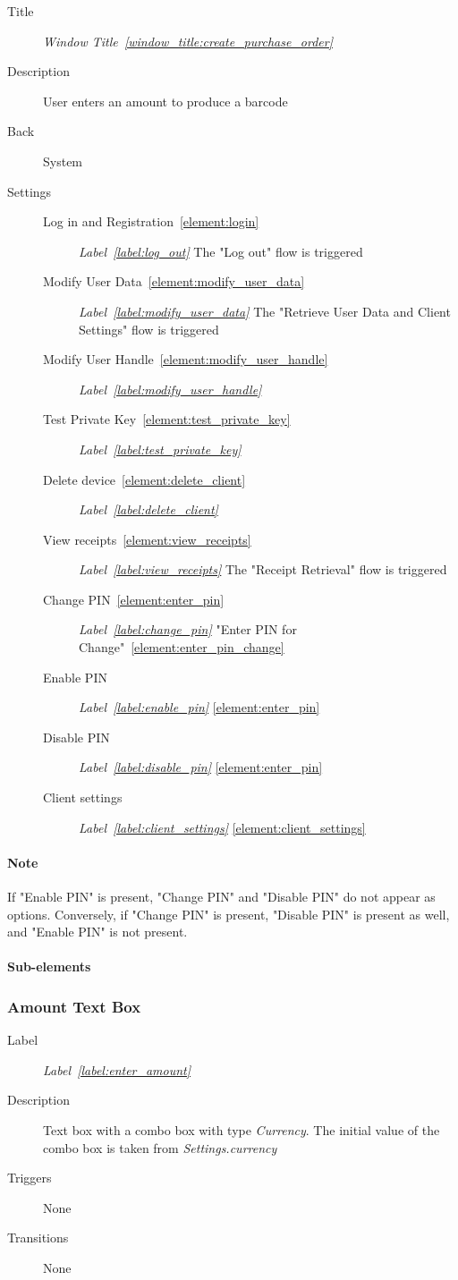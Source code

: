 \documentclass[a4paper,10pt]{article}
\newcommand{\windowTitleLabelText}{Window Title}
\newcommand{\windowTitleLabel}{window_title:}
\DeclareRobustCommand{\windowTitleRef}[1]{%
   \emph{\windowTitleLabelText~\ref{\windowTitleLabel#1}}}
\newcommand{\labelLabelText}{Label}
\newcommand{\labelLabel}{label:}
\DeclareRobustCommand{\labelRef}[1]{%
   \emph{\labelLabelText~\ref{\labelLabel#1}}}
\newcommand{\elementLabel}{element:}
\DeclareRobustCommand{\elementRef}[1]{\ref{\elementLabel#1}}
\begin{document}
\begin{description}
 \item[Title] \windowTitleRef{create_purchase_order}
 \item[Description] User enters an amount to produce a barcode
 \item[Back] System
 \item[Settings]\mbox{}
 \begin{description}
  \item[Log in and Registration~\elementRef{login}] 
\labelRef{log_out} The "Log out" flow is triggered
  \item[Modify User Data~\elementRef{modify_user_data}] 
\labelRef{modify_user_data} The "Retrieve User Data and Client Settings" flow 
is triggered
  \item[Modify User Handle~\elementRef{modify_user_handle}] 
\labelRef{modify_user_handle}
  \item[Test Private Key~\elementRef{test_private_key}] 
\labelRef{test_private_key}
  \item[Delete device~\elementRef{delete_client}] \labelRef{delete_client}
  \item[View receipts~\elementRef{view_receipts}] \labelRef{view_receipts} The 
"Receipt Retrieval" flow is triggered
 \item[Change PIN~\elementRef{enter_pin}] \labelRef{change_pin} "Enter PIN for 
Change"~\elementRef{enter_pin_change}
 \item[Enable PIN] \labelRef{enable_pin} \elementRef{enter_pin}
 \item[Disable PIN] \labelRef{disable_pin} \elementRef{enter_pin}
 \item[Client settings] \labelRef{client_settings} \elementRef{client_settings}
 \end{description}
\end{description}

\paragraph*{Note}
If "Enable PIN" is present, "Change PIN" and "Disable PIN" do not appear as 
options. Conversely, if "Change PIN" is present, "Disable PIN" is present as 
well, and "Enable PIN" is not present.

\paragraph{Sub-elements}

\subsubsection{Amount Text Box}
\label{main_screen:amount_text_box}
\begin{description}
 \item[Label] \labelRef{enter_amount}
 \item[Description] Text box with a combo box with type \emph{Currency}. The 
initial value of the combo box is taken from \emph{Settings.currency}
 \item[Triggers] None
 \item[Transitions] None
\end{description}
\end{document}
